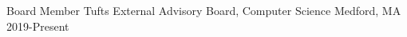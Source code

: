 

\begin{cvhonors}

  \cvhonor
    {Board Member} %
    {Tufts External Advisory Board, Computer Science} %
    {Medford, MA} %
    {2019-Present} %

\end{cvhonors}
